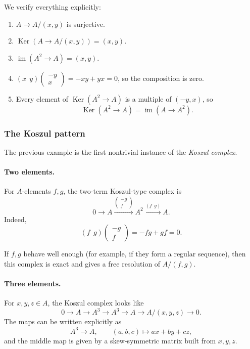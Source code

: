 \documentclass[12pt,a4paper]{article}
\theoremstyle{notespace}
\DeclareMathOperator{\im}{im}
\newcommand{\kerf}{\operatorname{Ker}}
\begin{document}
We verify everything explicitly:
\begin{enumerate}[leftmargin=2em]
	\item \(A\to A/(x,y)\) is surjective.
	\item \(\kerf(A\to A/(x,y))=(x,y)\).
	\item \(\im(A^2\to A)=(x,y)\).
	\item \((x\ \ y)\begin{pmatrix}-y\\x\end{pmatrix}=-xy+yx=0\), so the composition is zero.
	\item Every element of \(\kerf(A^2\to A)\) is a multiple of \((-y,x)\), so
	\[
	\kerf(A^2\to A)=\im(A\to A^2).
	\]
\end{enumerate}

\subsubsection{The Koszul pattern}

The previous example is the first nontrivial instance of the \emph{Koszul complex}.

\paragraph{Two elements.}

For \(A\)-elements \(f,g\), the two-term Koszul-type complex is
\[
0\longrightarrow A \xrightarrow{\begin{pmatrix}-g\\f\end{pmatrix}} A^2 \xrightarrow{(f\ \ g)} A.
\]
Indeed,
\[
(f\ \ g)\begin{pmatrix}-g\\f\end{pmatrix}=-fg+gf=0.
\]

If \(f,g\) behave well enough (for example, if they form a regular sequence), then this complex is exact and gives a free resolution of \(A/(f,g)\).

\paragraph{Three elements.}

For \(x,y,z\in A\), the Koszul complex looks like
\[
0\to A \to A^3 \to A^3 \to A \to A/(x,y,z)\to 0.
\]
The maps can be written explicitly as
\[
A^3 \to A,\qquad (a,b,c)\mapsto ax+by+cz,
\]
and the middle map is given by a skew-symmetric matrix built from \(x,y,z\).
\end{document}
